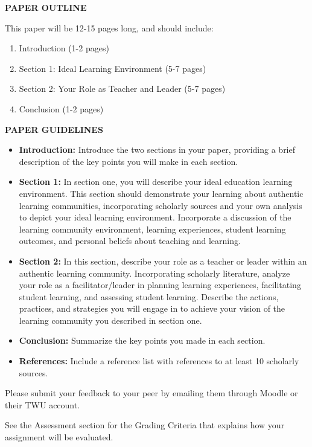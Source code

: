 \documentclass[
]{book}
\providecommand{\tightlist}{%
  \setlength{\itemsep}{0pt}\setlength{\parskip}{0pt}}
\begin{document}
\begin{assessment}
\textbf{PAPER OUTLINE}

This paper will be 12-15 pages long, and should include:

\begin{enumerate}
\def\labelenumi{\arabic{enumi}.}
\tightlist
\item
  Introduction (1-2 pages)
\item
  Section 1: Ideal Learning Environment (5-7 pages)
\item
  Section 2: Your Role as Teacher and Leader (5-7 pages)
\item
  Conclusion (1-2 pages)
\end{enumerate}

\textbf{PAPER GUIDELINES}

\begin{itemize}
\tightlist
\item
  \textbf{Introduction:} Introduce the two sections in your paper,
  providing a brief description of the key points you will make in each
  section.
\item
  \textbf{Section 1:} In section one, you will describe your ideal
  education learning environment. This section should demonstrate your
  learning about authentic learning communities, incorporating scholarly
  sources and your own analysis to depict your ideal learning
  environment. Incorporate a discussion of the learning community
  environment, learning experiences, student learning outcomes, and
  personal beliefs about teaching and learning.
\item
  \textbf{Section 2:} In this section, describe your role as a teacher
  or leader within an authentic learning community. Incorporating
  scholarly literature, analyze your role as a facilitator/leader in
  planning learning experiences, facilitating student learning, and
  assessing student learning. Describe the actions, practices, and
  strategies you will engage in to achieve your vision of the learning
  community you described in section one.
\item
  \textbf{Conclusion:} Summarize the key points you made in each
  section.
\item
  \textbf{References:} Include a reference list with references to at
  least 10 scholarly sources.
\end{itemize}

Please submit your feedback to your peer by emailing them through Moodle
or their TWU account.

See the Assessment section for the Grading Criteria that explains how
your assignment will be evaluated.
\end{assessment}
\end{document}
